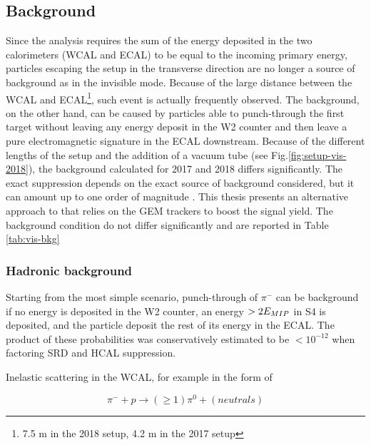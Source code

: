 \subsection{Background}
\label{ch3:sec:bkg:vis}

Since the analysis requires the sum of the energy deposited in the two calorimeters (WCAL and ECAL) to be equal to the incoming primary energy, particles escaping the setup in the transverse direction are no longer a source of background as in the invisible mode. Because of the large distance between the WCAL and ECAL\footnote{7.5 \si{\meter} in the 2018 setup, 4.2 \si{\meter} in the 2017 setup}, such event is actually frequently observed. The background, on the other hand, can be caused by particles able to punch-through the first target without leaving any energy deposit in the W2 counter and then leave a pure electromagnetic signature in the ECAL downstream. Because of the different lengths of the setup and the addition of a vacuum tube (see Fig.\ref{fig:setup-vis-2018}), the background calculated for 2017 and 2018 differs significantly. The exact suppression depends on the exact source of background considered, but it can amount up to one order of magnitude \cite{Banerjee:2019hmi}. This thesis presents an alternative approach to \cite{Banerjee:2019hmi} that relies on the GEM trackers to boost the signal yield. The background condition do not differ significantly and are reported in Table \ref{tab:vis-bkg}


\subsubsection{Hadronic background}
\label{ch3:sec:bkg:vis:hadr}

Starting from the most simple scenario, punch-through of $\pi^-$ can be background if no energy is deposited in the W2 counter, an energy $> 2E_{MIP}$ in S4 is deposited, and the particle deposit the rest of its energy in the ECAL. The product of these probabilities was conservatively estimated to be $< 10^{-12}$ when factoring SRD and HCAL suppression.

Inelastic scattering in the WCAL, for example in the form of

\begin{equation}
  \label{eq:vis-int-neutral}
  \pi^- + p \rightarrow (\geq 1)\pi^0 + (neutrals)
\end{equation}

